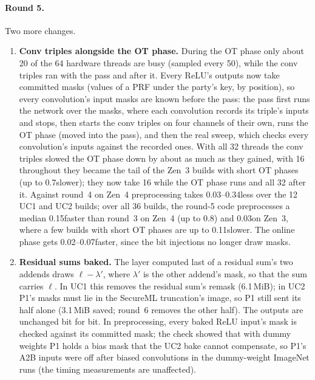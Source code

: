 \paragraph{Round 5.}\label{sec:triadround5} Two more changes.
\begin{enumerate}\itemsep1pt
\item \textbf{Conv triples alongside the OT phase.} During the OT phase only about 20 of the 64 hardware threads are
  busy (sampled every 50\ms), while the conv triples ran with the pass and after it. Every ReLU's outputs now take
  committed masks (values of a PRF under the party's key, by position), so every convolution's input masks are known
  before the pass: the pass first runs the network over the masks, where each convolution records its triple's
  inputs and stops, then starts the conv triples on four channels of their own, runs the OT phase (moved into the
  pass), and then the real sweep, which checks every convolution's inputs against the recorded ones. With all 32
  threads the conv triples slowed the OT phase down by about as much as they gained, with 16 throughout they became the
  tail of the Zen~3 builds with short OT phases (up to 0.7\s slower); they now take 16 while the OT phase runs and all
  32 after it. Against round~4 on Zen~4 preprocessing takes 0.03--0.34\s less over the 12 UC1 and UC2 builds; over all
  36 builds, the round-5 code preprocesses a median 0.15\s faster than round~3 on Zen~4 (up to 0.8\s) and 0.03\s on
  Zen~3, where a few builds with short OT phases are up to 0.11\s slower. The online phase gets 0.02--0.07\s faster,
  since the bit injections no longer draw masks.
\item \textbf{Residual sums baked.} The layer computed last of a residual sum's two addends draws $\ell - \lambda'$,
  where $\lambda'$ is the other addend's mask, so that the sum carries $\ell$. In UC1 this removes the residual sum's
  remask (6.1\,MiB); in UC2 P1's masks must lie in the SecureML truncation's image, so P1 still sent its half alone
  (3.1\,MiB saved; round~6 removes the other half). The outputs are unchanged bit for bit. In preprocessing, every baked ReLU input's mask is checked
  against its committed mask; the check showed that with dummy weights P1 holds a bias mask that the UC2 bake cannot
  compensate, so P1's A2B inputs were off after biased convolutions in the dummy-weight ImageNet runs (the timing
  measurements are unaffected).
\end{enumerate}

